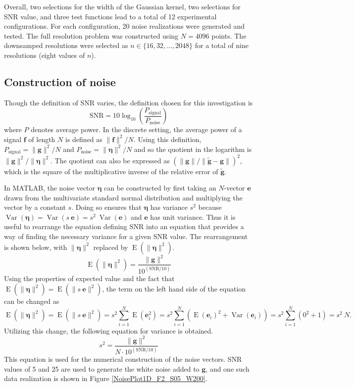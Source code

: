 \documentclass[12pt]{article}
\newcommand{\gdis}{\mathbf{g}}
\newcommand{\gnoise}{\widetilde{\mathbf{g}}}
\newcommand{\SD}{s}	%
\newcommand{\noise}{\bm{\eta}}	%
\newcommand{\Var}{\operatorname{Var}}	%
\newcommand{\E}{\operatorname{E}}	%
\begin{document}
Overall, two selections for the width of the Gaussian kernel, two selections for SNR value, and three test functions lead to a total of 12 experimental configurations. For each configuration, 20 noise realizations were generated and tested. The full resolution problem was constructed using $N = 4096$ points. The downsamped resolutions were selected as $n \in \{16,32,\ldots,2048\}$ for a total of nine resolutions (eight values of $n$).

\subsection{Construction of noise}

Though the definition of SNR varies, the definition chosen for this investigation is
\begin{equation}
\label{Eq_SNR}
\text{SNR} = 10\log_{10}\left(\frac{P_{\text{signal}}}{P_{\text{noise}}}\right)
\end{equation}
where $P$ denotes average power. In the discrete setting, the average power of a signal $\mathbf{f}$ of length $N$ is defined as $\|\mathbf{f}\|^2/N$. Using this definition, $P_{\text{signal}} = \|\gdis\|^2/N$ and $P_{\text{noise}} = \|\noise\|^2/N$ and so the quotient in the logarithm is $\|\gdis\|^2/\|\noise\|^2$. The quotient can also be expressed as $(\|\gdis\|/\|\gnoise - \gdis\|)^2$, which is the square of the multiplicative inverse of the relative error of $\gnoise$. \par
In MATLAB, the noise vector $\noise$ can be constructed by first taking an $N$-vector $\mathbf{e}$ drawn from the multivariate standard normal distribution and multiplying the vector by a constant $\SD$. Doing so ensures that $\noise$ has variance $\SD^2$ because $\Var(\noise) = \Var(\SD\:\mathbf{e}) = \SD^2\:\Var(\mathbf{e})$ and $\mathbf{e}$ has unit variance. Thus it is useful to rearrange the equation defining SNR into an equation that provides a way of finding the necessary variance for a given SNR value. The rearrangement is shown below, with $\|\noise\|^2$ replaced by $\E(\|\noise\|^2)$.
\[\E(\|\noise\|^2) = \frac{\|\gdis\|^2}{10^{(\text{SNR}/10)}}\]
Using the properties of expected value and the fact that $\E(\|\noise\|^2) = \E(\|\SD\:\mathbf{e}\|^2)$, the term on the left hand side of the equation can be changed as
\[\E(\|\noise\|^2) = \E(\|\SD\:\mathbf{e}\|^2) = \SD^2 \sum_{i=1}^N \E(\mathbf{e}_i^2) = \SD^2 \sum_{i=1}^N \left(\E(\mathbf{e}_i)^2 + \Var(\mathbf{e}_i)\right) = \SD^2 \sum_{i=1}^N \left(0^2 + 1\right) = \SD^2\:N.\]
Utilizing this change, the following equation for variance is obtained.
\begin{equation}
\label{Eq_Var}
\SD^2 = \frac{\|\gdis\|^2}{N \cdot 10^{(\text{SNR}/10)}}
\end{equation}
This equation is used for the numerical construction of the noise vectors. SNR values of 5 and 25 are used to generate the white noise added to $\gdis$, and one such data realization is shown in Figure \ref{NoisePlot1D_F2_S05_W200}. \par
\end{document}
